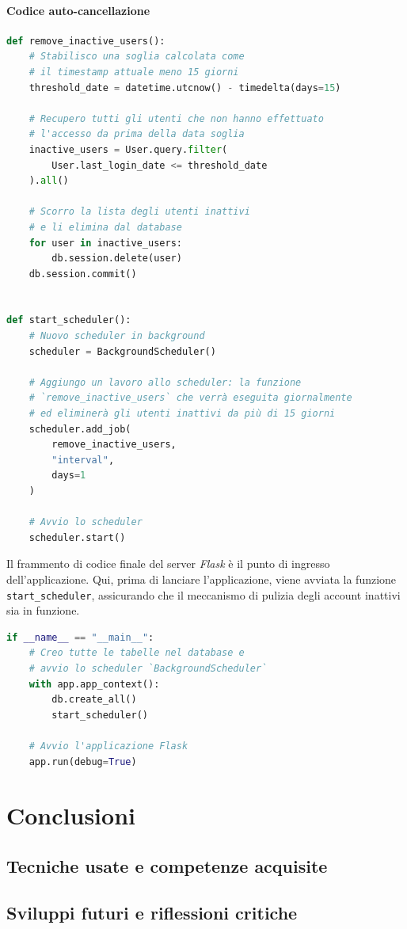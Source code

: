 \documentclass[12pt]{report}
\newcommand{\flask}{\textsl{Flask}\xspace}
\begin{document}
\subsubsection{Codice auto-cancellazione}
\begin{lstlisting}[language=Python]
def remove_inactive_users():
    # Stabilisco una soglia calcolata come
    # il timestamp attuale meno 15 giorni
    threshold_date = datetime.utcnow() - timedelta(days=15)

    # Recupero tutti gli utenti che non hanno effettuato
    # l'accesso da prima della data soglia
    inactive_users = User.query.filter(
        User.last_login_date <= threshold_date
    ).all()

    # Scorro la lista degli utenti inattivi
    # e li elimina dal database
    for user in inactive_users:
        db.session.delete(user)
    db.session.commit()


def start_scheduler():
    # Nuovo scheduler in background
    scheduler = BackgroundScheduler()

    # Aggiungo un lavoro allo scheduler: la funzione
    # `remove_inactive_users` che verrà eseguita giornalmente
    # ed eliminerà gli utenti inattivi da più di 15 giorni
    scheduler.add_job(
        remove_inactive_users,
        "interval",
        days=1
    )

    # Avvio lo scheduler
    scheduler.start()
\end{lstlisting}


\begin{mdframed}
\small
Il frammento di codice finale del server \flask è il punto di ingresso dell'applicazione. Qui, prima di lanciare l'applicazione, viene avviata la funzione \texttt{start\_scheduler}, assicurando che il meccanismo di pulizia degli account inattivi sia in funzione.

\begin{lstlisting}[language=Python]
if __name__ == "__main__":
    # Creo tutte le tabelle nel database e
    # avvio lo scheduler `BackgroundScheduler`
    with app.app_context():
        db.create_all()
        start_scheduler()

    # Avvio l'applicazione Flask
    app.run(debug=True)
\end{lstlisting}
\end{mdframed}


\clearpage\thispagestyle{empty}
\null\newpage


\chapter{Conclusioni}
\label{ch:conclusioni}


\section{Tecniche usate e competenze acquisite}
\section{Sviluppi futuri e riflessioni critiche}


\clearpage\thispagestyle{empty}
\null\newpage


\nocite{*}
\printbibliography
\end{document}
